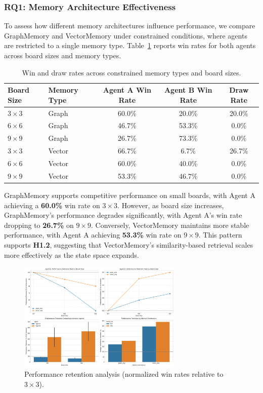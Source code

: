 \documentclass[10pt]{article}
\begin{document}
\subsubsection{RQ1: Memory Architecture Effectiveness}

To assess how different memory architectures influence performance, we compare GraphMemory and VectorMemory under constrained conditions, where agents are restricted to a single memory type. Table~\ref{tab:winrates} reports win rates for both agents across board sizes and memory types.

\begin{table}[h]
\centering
\small
\caption{Win and draw rates across constrained memory types and board sizes.}
\begin{tabular}{@{}llccc@{}}
\toprule
Board Size & Memory Type & Agent A Win Rate & Agent B Win Rate & Draw Rate \\
\midrule
$3 \times 3$ & Graph  & 60.0\% & 20.0\% & 20.0\% \\
$6 \times 6$ & Graph  & 46.7\% & 53.3\% & 0.0\% \\
$9 \times 9$ & Graph  & 26.7\% & 73.3\% & 0.0\% \\
$3 \times 3$ & Vector & 66.7\% & 6.7\%  & 26.7\% \\
$6 \times 6$ & Vector & 60.0\% & 40.0\% & 0.0\% \\
$9 \times 9$ & Vector & 53.3\% & 46.7\% & 0.0\% \\
\bottomrule
\end{tabular}
\label{tab:winrates}
\end{table}

GraphMemory supports competitive performance on small boards, with Agent A achieving a \textbf{60.0\%} win rate on $3\times3$. However, as board size increases, GraphMemory's performance degrades significantly, with Agent A's win rate dropping to \textbf{26.7\%} on $9\times9$. Conversely, VectorMemory maintains more stable performance, with Agent A achieving \textbf{53.3\%} win rate on $9\times9$. This pattern supports \textbf{H1.2}, suggesting that VectorMemory's similarity-based retrieval scales more effectively as the state space expands.

\begin{figure}[ht]
\centering
\includegraphics[width=0.7\textwidth]{figures/performance_retention_analysis.png}
\caption{Performance retention analysis (normalized win rates relative to $3\times3$).}
\label{fig:performance_retention}
\end{figure}
\end{document}

